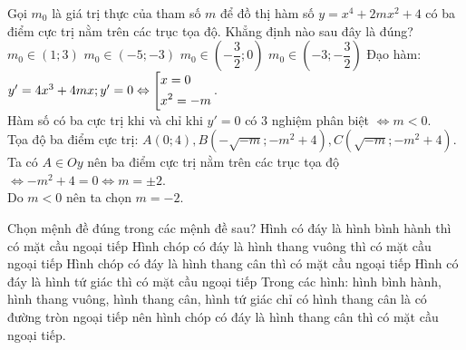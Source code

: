 \begin{ex}%
	Gọi $m_0$ là giá trị thực của tham số $m$ để đồ thị hàm số $y=x^4+2mx^2+4$ có ba điểm cực trị nằm trên các trục tọa độ. Khẳng định nào sau đây là đúng?
	\choice
	{$m_0\in\left(1;3\right)$}
	{$m_0\in\left(-5;-3\right)$}
	{$m_0\in\left(-\dfrac{3}{2};0\right)$}
	{\True $m_0\in\left(-3;-\dfrac{3}{2}\right)$}
	\loigiai
	{Đạo hàm: $y'=4x^3+4mx; y'=0\Leftrightarrow\left[\begin{aligned}&x=0\\&x^2=-m\end{aligned}\right.$.\\
		Hàm số có ba cực trị khi và chỉ khi $y'=0$ có $3$ nghiệm phân biệt $\Leftrightarrow m<0$.\\
		Tọa độ ba điểm cực trị: $A(0;4), B\left(-\sqrt{-m};-m^2+4\right), C\left(\sqrt{-m};-m^2+4\right)$.\\
		Ta có $A\in Oy$ nên ba điểm cực trị nằm trên các trục tọa độ $\Leftrightarrow -m^2+4=0\Leftrightarrow m=\pm 2$.\\Do $m<0$ nên ta chọn $m=-2$.
	}
\end{ex}

\begin{ex}%
	Chọn mệnh đề đúng trong các mệnh đề sau?
	\choice
	{Hình có đáy là hình bình hành thì có mặt cầu ngoại tiếp}
	{Hình chóp có đáy là hình thang vuông thì có mặt cầu ngoại tiếp}
	{\True Hình chóp có đáy là hình thang cân thì có mặt cầu ngoại tiếp}
	{Hình có đáy là hình tứ giác thì có mặt cầu ngoại tiếp}
	\loigiai
	{Trong các hình: hình bình hành, hình thang vuông, hình thang cân, hình tứ giác chỉ có hình thang cân là có đường tròn ngoại tiếp nên hình chóp có đáy là hình thang cân thì có mặt cầu ngoại tiếp.}
\end{ex}

